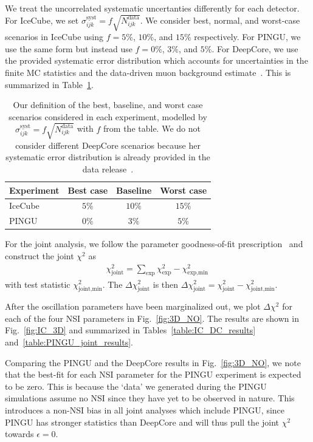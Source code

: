 \documentclass[draft=True]{revtex4-2}
\begin{document}
We treat the uncorrelated systematic uncertanties differently for each detector. For IceCube, we set $\sigma_{ijk}^\text{syst} = f\sqrt{N_{ijk}^\text{data}}$.
We consider best, normal, and worst-case scenarios in IceCube using
$f=5\%$, $10\%$, and $15\%$ respectively. For PINGU, we use the same form but instead use $f=0\%$, $3\%$, and $5\%$. %
For DeepCore, we use the provided systematic error distribution which accounts for uncertainties in the finite MC statistics and the data-driven 
muon background estimate~\cite{DC2019data}. This is summarized in Table~\ref{table:syst_errors}.  %
{\renewcommand{\arraystretch}{1.2}
\begin{table}
   \begin{tabular}{lccc}
      \hline \hline
      Experiment & Best case & Baseline & Worst case \\
      \hline
      IceCube & $5\%$ & $10\%$ & $15\%$ \\
      PINGU & $0\%$ & $3\%$ & $5\%$ \\
      \hline \hline
   \end{tabular}
   \caption{Our definition of the best, baseline, and worst case scenarios considered in each experiment, modelled by $\sigma_{ijk}^\text{syst} = f\sqrt{N_{ijk}^\text{data}}$ with $f$ from the table.
   We do not consider different DeepCore scenarios because her systematic error distribution is already provided in the data release~\cite{DC2019data}.}\label{table:syst_errors}
\end{table}

For the joint analysis, we follow the parameter goodness-of-fit prescription~\cite{maltoni2003} and construct the joint $\chi^2$ as 
\begin{align}\label{eq:joint_chisq}
    \chi^2_\text{joint} = \sum_\text{exp}\chi^2_\text{exp} - \chi^2_\text{exp,min}\,
\end{align}
with test statistic $\chi^2_\text{joint,min}$. The $\Delta \chi^2_\text{joint}$ is then $\Delta \chi^2_\text{joint} = \chi^2_\text{joint} - \chi^2_\text{joint,min}$.

After the oscillation parameters have been marginalized out, we plot $\Delta \chi^2$ for each of the four NSI parameters in Fig.~\ref{fig:3D_NO}. 
The results are shown in Fig.~\ref{fig:IC_3D} and summarized in Tables~\ref{table:IC_DC_results} and~\ref{table:PINGU_joint_results}.

Comparing the PINGU and the DeepCore results in Fig.~\ref{fig:3D_NO}, we note that the best-fit for each NSI parameter for the PINGU experiment is expected to be zero. This is because the `data' we generated during 
the PINGU simulations assume no NSI since they have yet to be observed in nature. This introduces a non-NSI bias in all joint analyses which include PINGU,
since PINGU has stronger statistics than DeepCore and will thus pull the joint $\chi^2$ towards $\epsilon =0$.

}
\end{document}
